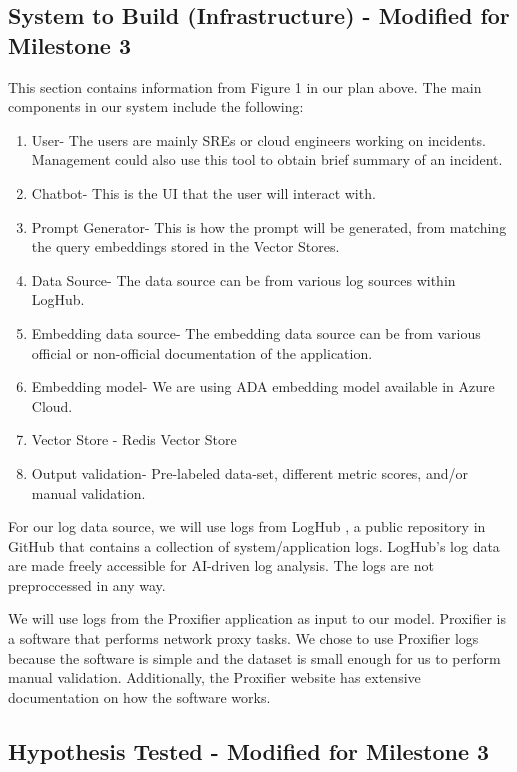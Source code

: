 \documentclass[conference]{IEEEtran}
\begin{document}
\subsection{System to Build (Infrastructure) - Modified for Milestone 3}

This section contains information from Figure 1 in our plan above. The main components in our system include the following:

\begin{enumerate}
    \item User- The users are mainly SREs or cloud engineers working on incidents. Management could also use this tool to obtain brief summary of an incident.
    \item Chatbot- This is the UI that the user will interact with.
    \item Prompt Generator- This is how the prompt will be generated, from matching the query embeddings stored in the Vector Stores.
    \item Data Source- The data source can be from various log sources within LogHub.
    \item Embedding data source- The embedding data source can be from various official or non-official documentation of the application.
    \item Embedding model- We are using ADA embedding model available in Azure Cloud.
    \item Vector Store - Redis Vector Store
    \item Output validation- Pre-labeled data-set, different metric scores, and/or manual validation.
\end{enumerate}

For our log data source, we will use logs from LogHub \cite{zhu2023loghub}, a public repository in GitHub that contains a collection of system/application logs. LogHub's log data are made freely accessible for AI-driven log analysis. The logs are not preproccessed in any way.

We will use logs from the Proxifier application as input to our model. Proxifier is a software that performs network proxy tasks. We chose to use Proxifier logs because the software is simple and the dataset is small enough for us to perform manual validation. Additionally, the Proxifier website has extensive documentation on how the software works.

\subsection{Hypothesis Tested - Modified for Milestone 3}\label{AA}
\end{document}
